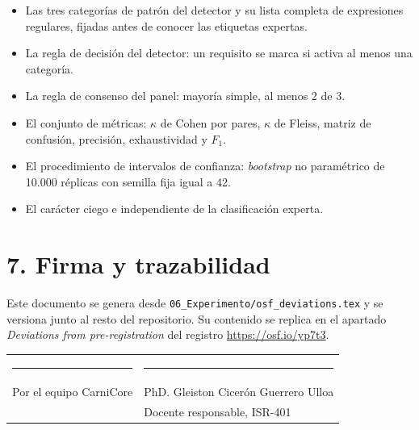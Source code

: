 \documentclass[11pt,a4paper]{article}
\begin{document}
\begin{itemize}
\item Las tres categorías de patrón del detector y su lista completa de
      expresiones regulares, fijadas antes de conocer las etiquetas expertas.
\item La regla de decisión del detector: un requisito se marca si activa al
      menos una categoría.
\item La regla de consenso del panel: mayoría simple, al menos 2 de 3.
\item El conjunto de métricas: $\kappa$ de Cohen por pares, $\kappa$ de Fleiss,
      matriz de confusión, precisión, exhaustividad y $F_1$.
\item El procedimiento de intervalos de confianza: \textit{bootstrap} no
      paramétrico de 10.000 réplicas con semilla fija igual a 42.
\item El carácter ciego e independiente de la clasificación experta.
\end{itemize}

\section*{7. Firma y trazabilidad}

Este documento se genera desde \texttt{06\_Experimento/osf\_deviations.tex} y
se versiona junto al resto del repositorio. Su contenido se replica en el
apartado \textit{Deviations from pre-registration} del registro
\url{https://osf.io/yp7t3}.

\vspace{10pt}
\noindent
\begin{tabular}{@{}p{7cm}p{7cm}@{}}
\rule{6cm}{0.4pt} & \rule{6cm}{0.4pt} \\
Por el equipo CarniCore & PhD. Gleiston Cicerón Guerrero Ulloa \\
& Docente responsable, ISR-401 \\
\end{tabular}
\end{document}
